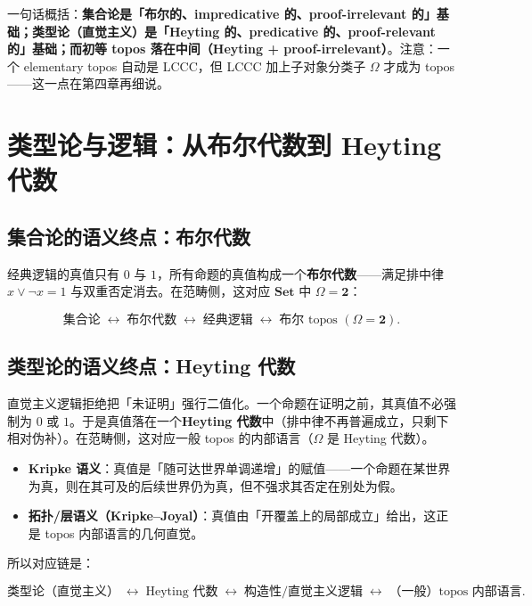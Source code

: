 \documentclass[10pt, openany]{book}
\begin{document}
一句话概括：\textbf{集合论是「布尔的、impredicative 的、proof-irrelevant 的」基础；类型论（直觉主义）是「Heyting 的、predicative 的、proof-relevant 的」基础；而初等 topos 落在中间（Heyting + proof-irrelevant）}。注意：一个 elementary topos 自动是 LCCC，但 LCCC 加上子对象分类子 $\Omega$ 才成为 topos——这一点在第四章再细说。

\section{类型论与逻辑：从布尔代数到 Heyting 代数}

\subsection{集合论的语义终点：布尔代数}

经典逻辑的真值只有 $0$ 与 $1$，所有命题的真值构成一个\textbf{布尔代数}——满足排中律 $x\vee\neg x = 1$ 与双重否定消去。在范畴侧，这对应 $\mathbf{Set}$ 中 $\Omega=\mathbf{2}$：

\[
  \text{集合论} \;\longleftrightarrow\; \text{布尔代数} \;\longleftrightarrow\; \text{经典逻辑} \;\longleftrightarrow\; \text{布尔 topos }(\Omega=\mathbf{2}).
\]

\subsection{类型论的语义终点：Heyting 代数}

直觉主义逻辑拒绝把「未证明」强行二值化。一个命题在证明之前，其真值不必强制为 $0$ 或 $1$。于是真值落在一个\textbf{Heyting 代数}中（排中律不再普遍成立，只剩下相对伪补）。在范畴侧，这对应一般 topos 的内部语言（$\Omega$ 是 Heyting 代数）。

\begin{itemize}
  \item \textbf{Kripke 语义}：真值是「随可达世界单调递增」的赋值——一个命题在某世界为真，则在其可及的后续世界仍为真，但不强求其否定在别处为假。
  \item \textbf{拓扑/层语义（Kripke--Joyal）}：真值由「开覆盖上的局部成立」给出，这正是 topos 内部语言的几何直觉。
\end{itemize}

所以对应链是：

\[
  \text{类型论（直觉主义）} \;\longleftrightarrow\; \text{Heyting 代数} \;\longleftrightarrow\; \text{构造性/直觉主义逻辑} \;\longleftrightarrow\; \text{（一般）topos 内部语言}.
\]
\end{document}
